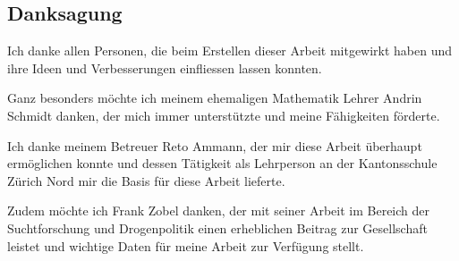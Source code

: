 \documentclass[../main.tex]{subfiles}
\begin{document}
	
	\subsection*{Danksagung}
	Ich danke allen Personen, die beim Erstellen dieser Arbeit mitgewirkt haben und ihre Ideen und Verbesserungen einfliessen lassen konnten.
	
	\noindent
	Ganz besonders möchte ich meinem ehemaligen Mathematik Lehrer Andrin Schmidt danken, der mich immer unterstützte und meine Fähigkeiten förderte.
	
	\noindent
	Ich danke meinem Betreuer Reto Ammann, der mir diese Arbeit überhaupt ermöglichen konnte und dessen Tätigkeit als Lehrperson an der Kantonsschule Zürich Nord mir die Basis für diese Arbeit lieferte.
	
	\noindent
	Zudem möchte ich Frank Zobel danken, der mit seiner Arbeit im Bereich der Suchtforschung und Drogenpolitik einen erheblichen Beitrag zur Gesellschaft leistet und wichtige Daten für meine Arbeit zur Verfügung stellt.
	
\end{document}
